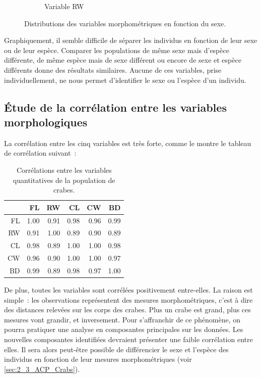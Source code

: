 \documentclass[a4paper,10pt]{report}
\begin{document}
\begin{figure}[H]
\begin{subfigure}[b]{0.3\linewidth}
		\caption{\scriptsize Variable RW}
		\label{fig:1_2_1_sex_rw}
	\end{subfigure}%
	\caption{
		\small Distributions des variables morphométriques en fonction du sexe.
	}
	\label{fig:morphemetriques_en_fonction_sexe}%
\end{figure}

Graphiquement, il semble difficile de séparer les individus en fonction de leur sexe ou de leur espèce. Comparer les populations de même sexe mais d'espèce différente, de même espèce mais de sexe différent ou encore de sexe et espèce différents donne des résultats similaires. Aucune de ces variables, prise individuellement, ne nous permet d'identifier le sexe ou l'espèce d'un individu.

\subsection{Étude de la corrélation entre les variables morphologiques}
\label{subsection:crabs_correlation_variables_quantitatives}

La corrélation entre les cinq variables est très forte, comme le montre le tableau de corrélation suivant~:
\begin{table}[h]
	\centering
	\captionsetup{justification=centering, margin=2cm}
	\caption{Corrélations entre les variables quantitatives de la population de crabes.}
	\begin{tabular}{r|rrrrr}
		& FL & RW & CL & CW & BD \\ 
		\hline
		FL & 1.00 & 0.91 & 0.98 & 0.96 & 0.99 \\ 
		RW & 0.91 & 1.00 & 0.89 & 0.90 & 0.89 \\ 
		CL & 0.98 & 0.89 & 1.00 & 1.00 & 0.98 \\ 
		CW & 0.96 & 0.90 & 1.00 & 1.00 & 0.97 \\ 
		BD & 0.99 & 0.89 & 0.98 & 0.97 & 1.00 \\ 
	\end{tabular}
\end{table}

De plus, toutes les variables sont corrélées positivement entre-elles. La raison est simple~: les observations représentent des mesures morphométriques, c'est à dire des distances relevées sur les corps des crabes. Plus un crabe est grand, plus ces mesures vont grandir, et inversement.
Pour s'affranchir de ce phénomène, on pourra pratiquer une analyse en composantes principales sur les données. Les nouvelles composantes identifiées devraient présenter une faible corrélation entre elles. Il sera alors peut-être possible de différencier le sexe et l'espèce des individus en fonction de leur mesures morphométriques (voir \autoref{sec:2_3_ACP_Crabs}).
\end{document}
